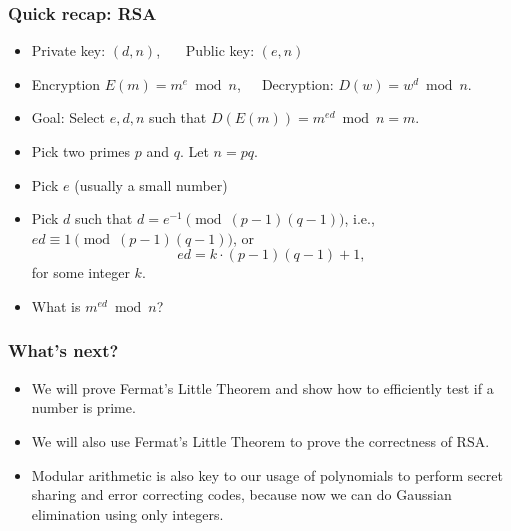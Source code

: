 \begin{frame}
  \frametitle{Quick recap: RSA}

  {\small
  \begin{itemize}
  \item Private key: $(d,n)$, \ \ \  Public key: $(e,n)$
  \item Encryption $E(m) = m^{e} \bmod n$,\ \ \  Decryption: $D(w) = w^{d} \bmod n$.
  \item Goal: Select $e,d,n$ such that $D(E(m)) = m^{ed}\bmod n = m$.
  \end{itemize}
  }
  
  \vspace{0.1in}
  \pause
  {\footnotesize
  \begin{itemize}
  \item Pick two primes $p$ and $q$.  Let $n=pq$.
  \item Pick $e$ (usually a small number)
  \item Pick $d$ such that $d = e^{-1} \pmod{(p-1)(q-1)}$, i.e., $ed\equiv 1 \pmod{(p-1)(q-1)}$, or
    \[
    ed = k\cdot(p-1)(q-1) + 1, 
    \]
    for some integer $k$.
  \item What is $m^{ed}\bmod n$?
  \end{itemize}
  }
  \vspace{0.5in}
\end{frame}

\begin{frame}
  \frametitle{What's next?}

  \begin{itemize}
  \item We will prove Fermat's Little Theorem and show how to
    efficiently test if a number is prime.
  \item We will also use Fermat's Little Theorem to prove the
    correctness of RSA.
  \item Modular arithmetic is also key to our usage of polynomials to
    perform secret sharing and error correcting codes, because now we
    can do Gaussian elimination using only integers.
  \end{itemize}
\end{frame}
